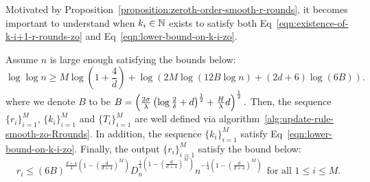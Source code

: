 Motivated by Proposition~\ref{proposition:zeroth-order-smooth-r-rounds}, it 
becomes important to understand when $k_i \in \mathbb{N}$ exists to satisfy both 
Eq~\eqref{eqn:existence-of-k-i+1-r-rounds-zo} and Eq~\eqref{eqn:lower-bound-on-k-i-zo}.


\begin{lemma}
\label{lemma:ef-zeroth-order-smooth-r-rounds}
Assume $n$ is large enough satisfying the bounds below: 
\begin{equation}
\label{eqn:ef-n-condition-zo-smooth-r-rounds}
\log \log n \geq M \log \left(1+ \frac{4}{d}\right)
	+ \log \left(2M \log(12B \log n) + (2d+6)\log (6B)\right).
\end{equation}
where we denote $B$ to be $
B = \left(\frac{2\sigma}{\lambda} 
	\left(\log \frac{2}{\delta} + d\right)^{\frac{1}{2}} + \frac{H}{\lambda}d\right)^{\frac{1}{2}}.$
Then, the sequence $\{r_i\}_{i=1}^M$, $\{k_i\}_{i=1}^M$ and $\{T_i\}_{i=1}^M$ are 
well defined via algorithm~\ref{alg:update-rule-smooth-zo-Rrounds}. In addition, 
the sequence $\{k_i\}_{i=1}^M$ satisfy Eq~\eqref{eqn:lower-bound-on-k-i-zo}.
Finally, the output $\{r_i\}_{i=1}^M$ satisfy the bound below: 
\begin{equation*}
r_i \leq (6B)^{\frac{d+4}{4} \left(1-\left(\frac{d}{d+4}\right)^M\right)}
		D_n^{\frac{1}{4} \left(1 - \left(\frac{d}{d+4}\right)^M\right)}
		n^{-\frac{1}{4} \left(1 - \left(\frac{d}{d+4}\right)^M\right)}~~\text{for all $1\leq i\leq M$}.
\end{equation*}
\end{lemma}

